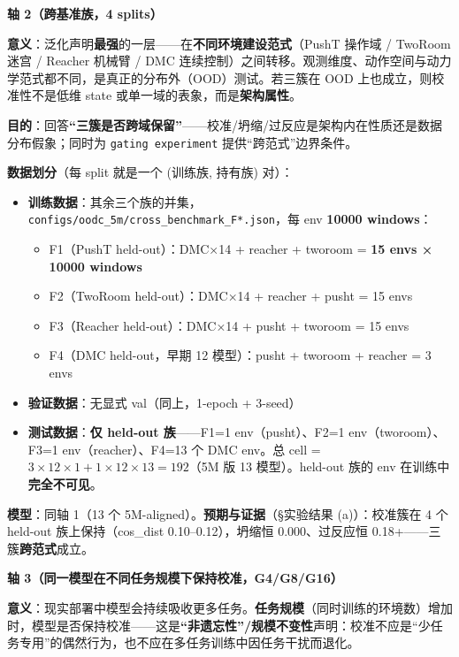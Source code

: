 \documentclass[11pt,a4paper]{article}
\begin{document}
\textbf{轴 2（跨基准族，4 splits）}

\textbf{意义}：泛化声明\textbf{最强}的一层——在\textbf{不同环境建设范式}（PushT 操作域 / TwoRoom 迷宫 / Reacher 机械臂 / DMC 连续控制）之间转移。观测维度、动作空间与动力学范式都不同，是真正的分布外（OOD）测试。若三簇在 OOD 上也成立，则校准性不是低维 state 或单一域的表象，而是\textbf{架构属性}。

\textbf{目的}：回答\textbf{“三簇是否跨域保留”}——校准/坍缩/过反应是架构内在性质还是数据分布假象；同时为 \texttt{gating experiment} 提供“跨范式”边界条件。

\textbf{数据划分}（每 split 就是一个 (训练族, 持有族) 对）：
\begin{itemize}[leftmargin=2em]
    \item \textbf{训练数据}：其余三个族的并集，\texttt{configs/oodc\_5m/cross\_benchmark\_F*.json}，每 env \textbf{10000 windows}：
    \begin{itemize}
        \item F1（PushT held-out）：DMC×14 + reacher + tworoom = \textbf{15 envs × 10000 windows}
        \item F2（TwoRoom held-out）：DMC×14 + reacher + pusht = 15 envs
        \item F3（Reacher held-out）：DMC×14 + pusht + tworoom = 15 envs
        \item F4（DMC held-out，早期 12 模型）：pusht + tworoom + reacher = 3 envs
    \end{itemize}
    \item \textbf{验证数据}：无显式 val（同上，1-epoch + 3-seed）
    \item \textbf{测试数据}：\textbf{仅 held-out 族}——F1=1 env（pusht）、F2=1 env（tworoom）、F3=1 env（reacher）、F4=13 个 DMC env。总 cell = $3 \times 12 \times 1 + 1 \times 12 \times 13 = 192$（5M 版 13 模型）。held-out 族的 env 在训练中\textbf{完全不可见}。
\end{itemize}

\textbf{模型}：同轴 1（13 个 5M-aligned）。\textbf{预期与证据}（§实验结果 (a)）：校准簇在 4 个 held-out 族上保持（cos\_dist 0.10--0.12），坍缩恒 0.000、过反应恒 0.18+——三簇\textbf{跨范式}成立。

\textbf{轴 3（同一模型在不同任务规模下保持校准，G4/G8/G16）}

\textbf{意义}：现实部署中模型会持续吸收更多任务。\textbf{任务规模}（同时训练的环境数）增加时，模型是否保持校准——这是\textbf{“非遗忘性”/规模不变性}声明：校准不应是“少任务专用”的偶然行为，也不应在多任务训练中因任务干扰而退化。
\end{document}

